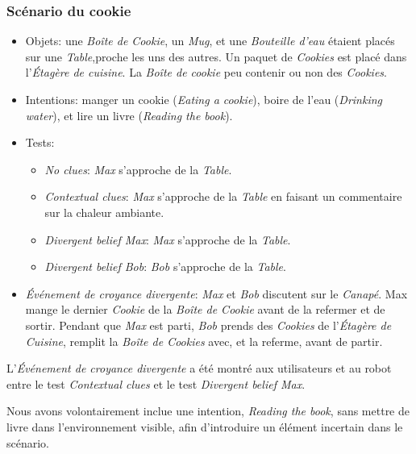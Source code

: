 \documentclass[a4paper,11pt,twoside]{StyleThese}
\begin{document}
\subsubsection{Scénario du cookie}
\begin{itemize}
\item Objets: une \textit{Boîte de Cookie}, un \textit{Mug}, et une \textit{Bouteille d'eau} étaient placés sur une \textit{Table},proche les uns des autres. Un paquet de \textit{Cookies} est placé dans l'\textit{Étagère de cuisine}. La \textit{Boîte de cookie} peu contenir ou non des \textit{Cookies}.
\item Intentions: manger un cookie (\textit{Eating a cookie}), boire de l'eau (\textit{Drinking water}), et lire un livre (\textit{Reading the book}).
\item Tests:
\begin{itemize}
	\item \textit{No clues}: \textit{Max} s'approche de la \textit{Table}.
    \item \textit{Contextual clues}: \textit{Max} s'approche de la \textit{Table} en faisant un commentaire sur la chaleur ambiante.
	\item \textit{Divergent belief Max}: \textit{Max} s'approche de la \textit{Table}.
	\item \textit{Divergent belief Bob}: \textit{Bob} s'approche de la \textit{Table}.
\end{itemize}
\item  \textit{Événement de croyance divergente}:  \textit{Max} et \textit{Bob} discutent sur le \textit{Canapé}. Max mange le dernier \textit{Cookie} de la \textit{Boîte de Cookie} avant de la refermer et de sortir. Pendant que \textit{Max} est parti, \textit{Bob} prends des \textit{Cookies} de l'\textit{Étagère de Cuisine}, remplit la \textit{Boîte de Cookies} avec, et la referme, avant de partir.
\end{itemize}

L'\textit{Événement de croyance divergente} a été montré aux utilisateurs et au robot entre le test \textit{Contextual clues} et le test \textit{Divergent belief Max}. 

Nous avons volontairement inclue une intention, \textit{Reading the book}, sans mettre de livre dans l'environnement visible, afin d'introduire un élément incertain dans le scénario.
\end{document}
